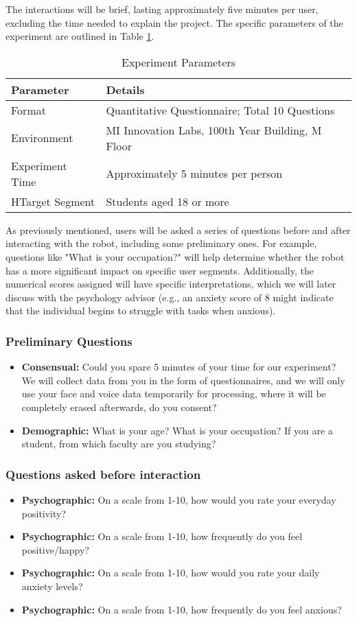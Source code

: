 The interactions will be brief, lasting approximately five minutes per user, excluding the time needed to explain the project. The specific parameters of the experiment are outlined in Table \ref{table:parameters}.

\begin{table}[h]
\centering
\caption{Experiment Parameters}
\label{table:parameters}
\begin{tabular}{|l|l|}
\hline
\textbf{Parameter} & \textbf{Details} \\ \hline
Format & Quantitative Questionnaire; Total 10 Questions \\ \hline
Environment & MI Innovation Labs, 100th Year Building, M Floor \\ \hline
Experiment Time & Approximately 5 minutes per person \\ \hline
HTarget Segment & Students aged 18 or more \\ \hline
\end{tabular}
\end{table}

As previously mentioned, users will be asked a series of questions before and after interacting with the robot, including some preliminary ones. For example, questions like "What is your occupation?" will help determine whether the robot has a more significant impact on specific user segments. Additionally, the numerical scores assigned will have specific interpretations, which we will later discuss with the psychology advisor (e.g., an anxiety score of 8 might indicate that the individual begins to struggle with tasks when anxious).

\subsubsection*{Preliminary Questions}
\begin{itemize}
    \item \textbf{Consensual:} Could you spare 5 minutes of your time for our experiment? We will collect data from you in the form of questionnaires, and we will only use your face and voice data temporarily for processing, where it will be completely erased afterwards, do you consent?
    \item \textbf{Demographic:} What is your age? What is your occupation? If you are a student, from which faculty are you studying?
\end{itemize}
\subsubsection*{Questions asked before interaction}
\begin{itemize}
    \item \textbf{Psychographic:} On a scale from 1-10, how would you rate your everyday positivity? 
    \item \textbf{Psychographic:} On a scale from 1-10, how frequently do you feel positive/happy? 
    \item \textbf{Psychographic:} On a scale from 1-10, how would you rate your daily anxiety levels?
    \item \textbf{Psychographic:} On a scale from 1-10, how frequently do you feel anxious?
\end{itemize}
